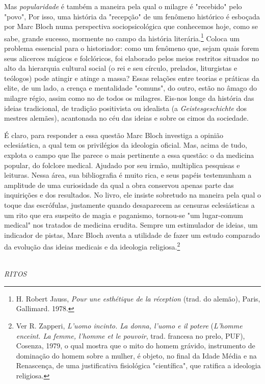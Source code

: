\documentclass[a5paper]{book}
\begin{document}
Mas \textit{popularidade} é também a maneira pela qual o milagre é "recebido" pelo "povo", Por isso, uma história da "recepção" de um fenômeno histórico é esboçada por Marc Bloch numa perspectiva sociopsicológica que conhecemos hoje, como se sabe, grande sucesso, mormente no campo da história literária.\footnote{H. Robert Jauss, \textit{Pour une esthétique de la réception} (trad. do alemão), Paris, Gallimard. 1978.} Coloca um problema essencial para o historiador: como um fenômeno que, sejam quais forem seus alicerces mágicos e folclóricos, foi elaborado pelos meios restritos situados no alto da hierarquia cultural social (o rei e seu círculo, prelados, liturgistas e teólogos) pode atingir e atinge a massa? Essas relações entre teorias e práticas da elite, de um lado, a crença e mentalidade "comuns", do outro, estão no âmago do milagre régio, assim como no de todos os milagres. Eis-nos longe da história das ideias tradicional, de tradição positivista ou idealista (a \textit{Geistesgeschichte} dos mestres alemães), acantonada no céu das ideias e sobre os cimos da sociedade.

É claro, para responder a essa questão Marc Bloch investiga a opinião eclesiástica, a qual tem os privilégios da ideologia oficial. Mas, acima de tudo, explota o campo que lhe parece o mais pertinente a essa questão: o da medicina popular, do folclore medical. Ajudado por seu irmão, multiplica pesquisas e leituras. Nessa área, sua bibliografia é muito rica, e seus papéis testemunham a amplitude de uma curiosidade da qual a obra conservou apenas parte das inquirições e dos resultados. No livro, ele insiste sobretudo na maneira pela qual o toque das escrófulas, justamente quando desaparecem as censuras eclesiásticas a um rito que era suspeito de magia e paganismo, tornou-se "um lugar-comum medical" nos tratados de medicina erudita. Sempre um estimulador de ideias, um indicador de pistas, Marc Bloch aventa a utilidade de fazer um estudo comparado da evolução das ideias medicais e da ideologia religiosa.\footnote{Ver R. Zapperi, \textit{L'uomo incinto. La donna, l'uomo e il potere} (\textit{L'homme enceint. La femme, l'homme et le pouvoir}, trad. francesa no prelo, PUF), Cosenza, 1979, o qual mostra que o mito do homem grávido, instrumento de dominação do homem sobre a mulher, é objeto, no final da Idade Média e na Renascença, de uma justificativa fisiológica "científica", que ratifica a ideologia religiosa.}

~\\ \large \textit{RITOS} ~\\
\end{document}
